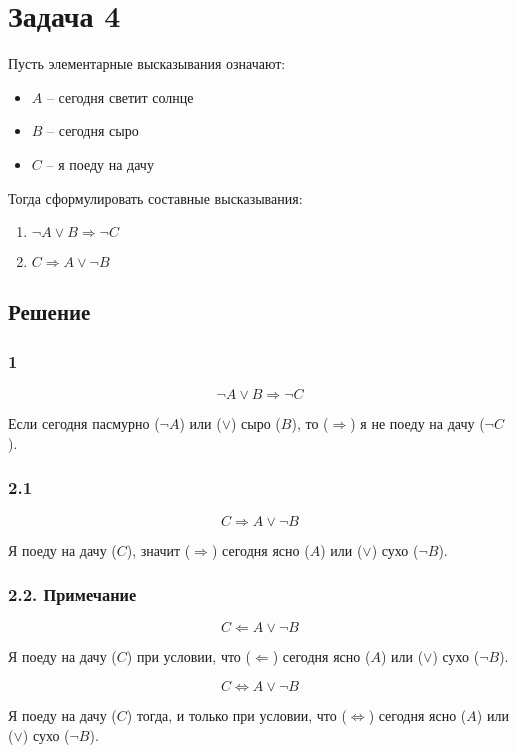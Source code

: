 \section*{Задача 4}

Пусть элементарные высказывания означают:
\begin{itemize}
  \item \(A\) -- сегодня светит солнце
  \item \(B\) -- сегодня сыро
  \item \(C\) -- я поеду на дачу
\end{itemize}

Тогда сформулировать составные высказывания:
\begin{enumerate}
  \item \(\neg A \vee B \Rightarrow \neg C\)
  \item \(C \Rightarrow A \vee \neg B\)
\end{enumerate}

\subsection*{Решение}

\subsubsection*{1}

\[\neg A \vee B \Rightarrow \neg C\]

Если сегодня пасмурно (\(\neg A\)) или (\(\vee\)) сыро (\(B\)),
то (\(\Rightarrow\)) я не поеду на дачу (\(\neg C\)).

\subsubsection*{2.1}

\[C \Rightarrow A \vee \neg B\]

Я поеду на дачу (\(C\)),
значит (\(\Rightarrow\)) сегодня ясно (\(A\)) или (\(\vee\)) сухо (\(\neg B\)).

\subsubsection*{2.2. Примечание}

\[C \Leftarrow A \vee \neg B\]

Я поеду на дачу (\(C\)) при условии, что (\(\Leftarrow\))
сегодня ясно (\(A\)) или (\(\vee\)) сухо (\(\neg B\)).

\[C \Leftrightarrow A \vee \neg B\]

Я поеду на дачу (\(C\)) тогда, и только при условии, что (\(\Leftrightarrow\))
сегодня ясно (\(A\)) или (\(\vee\)) сухо (\(\neg B\)).

